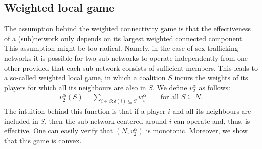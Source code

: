 \documentclass[10p]{article}
\theoremstyle{definition}
\theoremstyle{definition}
\begin{document}
\subsection{Weighted local game}
The assumption behind the weighted connectivity game is that the effectiveness of a (sub)network only depends on its largest weighted connected component. This assumption might be too radical. Namely, in the case of sex trafficking networks it is possible for two sub-networks to operate independently from one other provided that each sub-network consists of sufficient members. This leads to a so-called weighted local game, in which a coalition $S$ incurs the weights of its players for which all its neighbours are also in $S$. We define $v_2^\alpha$ as follows:
\begin{align*}
    v_2^\alpha (S) = \sum_{i \in S : \delta(i) \subseteq S} w_i^
    \alpha \qquad \text{for all $S \subseteq N$.}
\end{align*}
The intuition behind this function is that if a player $i$ and all its neighbours are included in $S$, then the sub-network centered around $i$ can operate and, thus, is effective. One can easily verify that $(N,v_2^\alpha)$ is monotonic. Moreover, we show that this game is convex.
\end{document}

